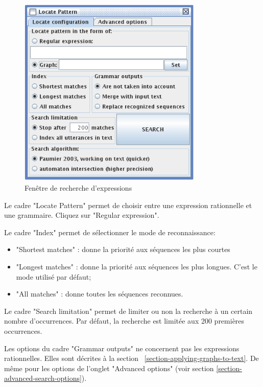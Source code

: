 \bigskip
\begin{figure}[h]
\begin{center}
\includegraphics[width=8.8cm]{resources/img/fig4-4.png}
\caption{Fenêtre de recherche d’expressions\label{fig-regexp-search-configuration}}
\end{center}
\end{figure}

\noindent Le cadre "Locate Pattern" permet de choisir entre une expression rationnelle et une
grammaire. Cliquez sur "Regular expression".


\bigskip
\noindent Le cadre "Index" permet de sélectionner le mode de reconnaissance:

\bigskip
{}
\begin{itemize}
  \item "Shortest matches" : donne la priorité aux séquences les plus courtes
  \item "Longest matches" : donne la priorité aux séquences les plus longues. C’est le mode utilisé
  	  par défaut;
  \item "All matches" : donne toutes les séquences reconnues.
\end{itemize}

\bigskip
\noindent Le cadre "Search limitation" permet de limiter ou non la recherche à un certain nombre
d’occurrences. Par défaut, la recherche est limitée aux 200 premières occurrences.

\bigskip
\noindent Les options du cadre "Grammar outputs" ne concernent pas les expressions rationnelles.
Elles sont décrites à la section
~\ref{section-applying-graphs-to-text}. De même pour les options de l'onglet
"Advanced options" (voir section \ref{section-advanced-search-options}).

